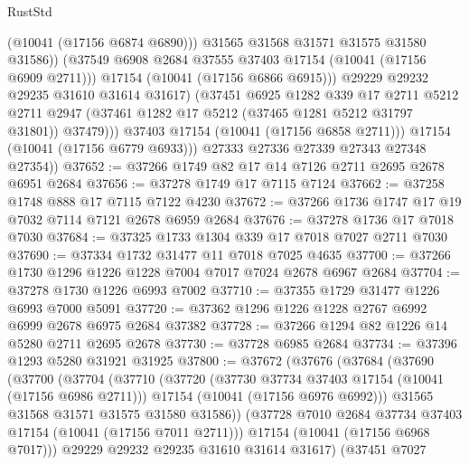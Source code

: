 \begin{lexlean}{RustStd}
\begin{coremodule}
                          (@10041 (@17156 @6874 @6890)))
                        @31565
                        @31568
                        @31571
                        @31575
                        @31580
                        @31586))
                    (@37549 @6908 @2684 @37555 @37403 @17154 (@10041 (@17156 @6909 @2711)))
                    @17154
                    (@10041 (@17156 @6866 @6915)))
                  @29229
                  @29232
                  @29235
                  @31610
                  @31614
                  @31617)
                (@37451
                  @6925
                  @1282
                  @339
                  @17
                  @2711
                  @5212
                  @2711
                  @2947
                  (@37461 @1282 @17 @5212 (@37465 @1281 @5212 @31797 @31801))
                  @37479)))
            @37403
            @17154
            (@10041 (@17156 @6858 @2711)))
          @17154
          (@10041 (@17156 @6779 @6933)))
        @27333
        @27336
        @27339
        @27343
        @27348
        @27354))
@37652 := @37266 @1749 @82 @17 @14 @7126 @2711 @2695 @2678 @6951 @2684
@37656 := @37278 @1749 @17 @7115 @7124
@37662 := @37258 @1748 @888 @17 @7115 @7122 @4230
@37672 := @37266 @1736 @1747 @17 @19 @7032 @7114 @7121 @2678 @6959 @2684
@37676 := @37278 @1736 @17 @7018 @7030
@37684 := @37325 @1733 @1304 @339 @17 @7018 @7027 @2711 @7030
@37690 := @37334 @1732 @31477 @11 @7018 @7025 @4635
@37700 := @37266 @1730 @1296 @1226 @1228 @7004 @7017 @7024 @2678 @6967 @2684
@37704 := @37278 @1730 @1226 @6993 @7002
@37710 := @37355 @1729 @31477 @1226 @6993 @7000 @5091
@37720 := @37362 @1296 @1226 @1228 @2767 @6992 @6999 @2678 @6975 @2684 @37382
@37728 := @37266 @1294 @82 @1226 @14 @5280 @2711 @2695 @2678
@37730 := @37728 @6985 @2684
@37734 := @37396 @1293 @5280 @31921 @31925
@37800 := @37672
    (@37676
      (@37684
        (@37690
          (@37700
            (@37704
              (@37710
                (@37720
                  (@37730 @37734 @37403 @17154 (@10041 (@17156 @6986 @2711)))
                  @17154
                  (@10041 (@17156 @6976 @6992)))
                @31565
                @31568
                @31571
                @31575
                @31580
                @31586))
            (@37728 @7010 @2684 @37734 @37403 @17154 (@10041 (@17156 @7011 @2711)))
            @17154
            (@10041 (@17156 @6968 @7017)))
          @29229
          @29232
          @29235
          @31610
          @31614
          @31617)
        (@37451
          @7027

\end{coremodule}
\end{lexlean}
